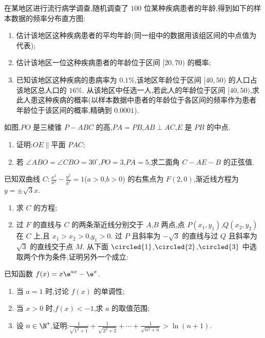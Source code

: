 \begin{problem}
在某地区进行流行病学调查,随机调查了 \(100\) 位某种疾病患者的年龄,得到如下的样本数据的频率分布直方图:

\begin{enumerate}
\item 估计该地区这种疾病患者的平均年龄(同一组中的数据用该组区间的中点值为代表);
\item 估计该地区一位这种疾病患者的年龄位于区间 \([20,70)\) 的概率;
\item 已知该地区这种疾病的患病率为 \(0.1\%\),该地区年龄位于区间 \([40,50)\) 的人口占该地区总人口的 \(16\%\). 从该地区中任选一人,若此人的年龄位于区间 \([40,50)\),求此人患这种疾病的概率(以样本数据中患者的年龄位于各区间的频率作为患者年龄位于该区间的概率,精确到 \(0.0001\)).
\end{enumerate}

\end{problem}

\begin{problem}
如图,\(PO\) 是三棱锥 \(P-ABC\) 的高,\(PA=PB\),\(AB\perp AC\),\(E\) 是 \(PB\) 的中点.

\begin{enumerate}
\item 证明:\(OE\parallel\text{平面 }PAC\);
\item 若 \(\angle ABO=\angle CBO=30^\circ\),\(PO=3\),\(PA=5\),求二面角 \(C-AE-B\) 的正弦值.
\end{enumerate}

\end{problem}

\begin{problem}
已知双曲线 \(C:\frac{x^2}{a^2}-\frac{y^2}{b^2}=1\)(\(a>0\),\(b>0\)) 的右焦点为 \(F(2,0)\),渐近线方程为 \(y=\pm \sqrt3 x\).
\begin{enumerate}
\item 求 \(C\) 的方程;
\item 过 \(F\) 的直线与 \(C\) 的两条渐近线分别交于 \(A\),\(B\) 两点,点 \(P(x_1,y_1)\),\(Q(x_2,y_2)\) 在 \(C\) 上,且 \(x_1>x_2>0\),\(y_1>0\). 过 \(P\) 且斜率为 \(-\sqrt3\) 的直线与过 \(Q\) 且斜率为 \(\sqrt3\) 的直线交于点 \(M\). 从下面 \(\circled{1}\),\(\circled{2}\),\(\circled{3}\) 中选取两个作为条件,证明另外一个成立:
\end{enumerate}
\end{problem}

\begin{problem}
已知函数 \(f(x)=x\e^{ax}-\e^x\).
\begin{enumerate}
\item 当 \(a=1\) 时,讨论 \(f(x)\) 的单调性;
\item 当 \(x>0\) 时,\(f(x)<-1\),求 \(a\) 的取值范围;
\item 设 \(n\in \N^*\),证明:\(\frac{1}{\sqrt{1^2+1}}+\frac{1}{\sqrt{2^2+2}}+\cdots+\frac{1}{\sqrt{n^2+n}}>\ln(n+1)\).
\end{enumerate}
\end{problem}

